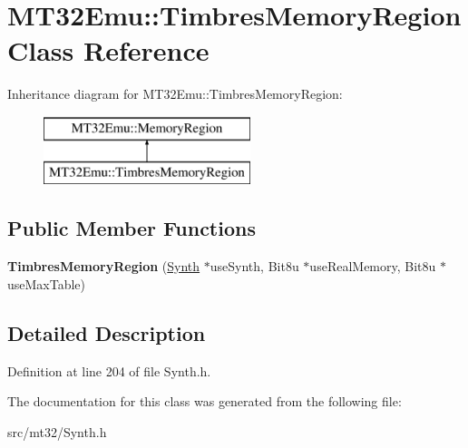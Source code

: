 \hypertarget{classMT32Emu_1_1TimbresMemoryRegion}{\section{M\-T32\-Emu\-:\-:Timbres\-Memory\-Region Class Reference}
\label{classMT32Emu_1_1TimbresMemoryRegion}
}
Inheritance diagram for M\-T32\-Emu\-:\-:Timbres\-Memory\-Region\-:\begin{figure}[H]
\begin{center}
\leavevmode
\includegraphics[height=2.000000cm]{classMT32Emu_1_1TimbresMemoryRegion}
\end{center}
\end{figure}
\subsection*{Public Member Functions}
\begin{DoxyCompactItemize}
\item 
\hypertarget{classMT32Emu_1_1TimbresMemoryRegion_ab466732e8a8dc2700408f3949cfe7642}{{\bfseries Timbres\-Memory\-Region} (\hyperlink{classMT32Emu_1_1Synth}{Synth} $\ast$use\-Synth, Bit8u $\ast$use\-Real\-Memory, Bit8u $\ast$use\-Max\-Table)}\label{classMT32Emu_1_1TimbresMemoryRegion_ab466732e8a8dc2700408f3949cfe7642}

\end{DoxyCompactItemize}


\subsection{Detailed Description}


Definition at line 204 of file Synth.\-h.



The documentation for this class was generated from the following file\-:\begin{DoxyCompactItemize}
\item 
src/mt32/Synth.\-h\end{DoxyCompactItemize}
